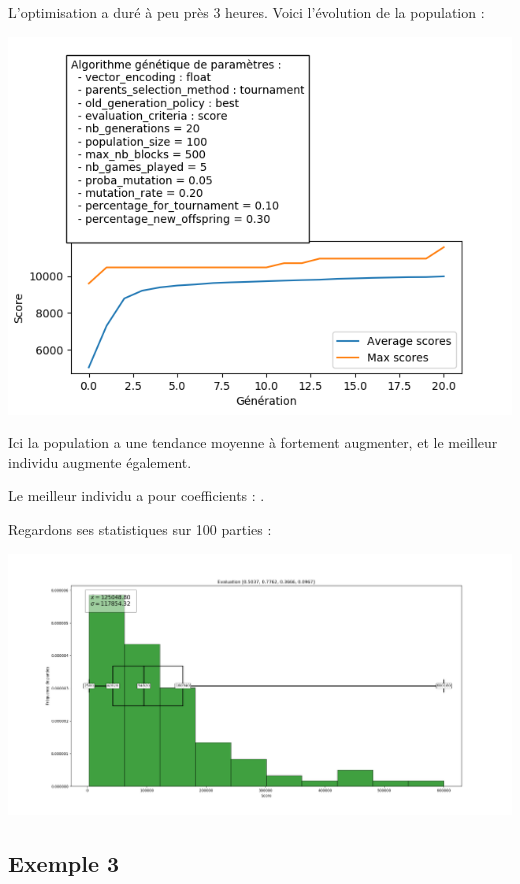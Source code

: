 L'optimisation a duré à peu près 3 heures. Voici l'évolution de la population :

\includegraphics[scale=0.95]{media/results/AG11.png}

Ici la population a une tendance moyenne à fortement augmenter,  et le meilleur individu augmente également. 

\medskip

Le meilleur individu a pour coefficients : \pyth{[0.5037, 0.7762, 0.3666, 0.0967]}.
\newpage

Regardons ses statistiques sur 100 parties :

\includegraphics[scale=0.35]{media/results/Stats_Eval_0,5037_0,7762_0,3666_0,0967.png}

\newpage

\subsection{Exemple 3}

